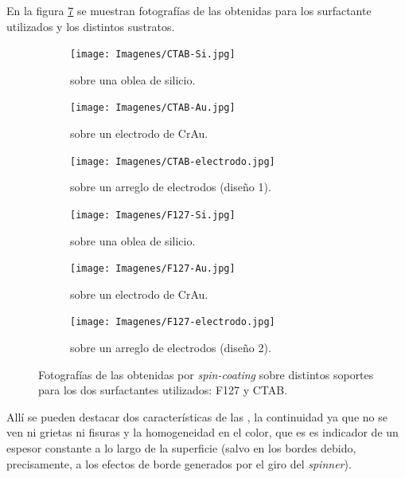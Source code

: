 		En la figura \ref{fig:fotos_films} se muestran fotografías de las \pdm\space obtenidas para los surfactante utilizados y los distintos sustratos. 

			\begin{figure}[th]
	 	   	    \begin{subfigure}[t]{0.325\textwidth}
		        	\texttt{[image: Imagenes/CTAB-Si.jpg]}
		       		\caption{\pdmC\space sobre una oblea de silicio.}
		         	\label{fig:F127_vidrio}
		     		\end{subfigure}
	     		\begin{subfigure}[t]{0.325\textwidth}
		        	\texttt{[image: Imagenes/CTAB-Au.jpg]}
		       		\caption{\pdmC\space sobre un electrodo de Cr\textbar Au.}
		         	\label{fig:F127_silicio}
		     		\end{subfigure}
	     		\begin{subfigure}[t]{0.325\textwidth}
		        	\texttt{[image: Imagenes/CTAB-electrodo.jpg]}
		       		\caption{\pdmC\space sobre un arreglo de electrodos (diseño 1).}
		         	\label{fig:F127_Au}
		     		\end{subfigure}
	 	   	    \begin{subfigure}[t]{0.325\textwidth}
		        	\texttt{[image: Imagenes/F127-Si.jpg]}
		       		\caption{\pdmF\space sobre una oblea de silicio.}
		         	\label{fig:CTAB_vidrio}
		     		\end{subfigure}
	     		\begin{subfigure}[t]{0.325\textwidth}
		        	\texttt{[image: Imagenes/F127-Au.jpg]}
		       		\caption{\pdmF\space sobre un electrodo de Cr\textbar Au.}
		         	\label{fig:CTAB_silicio}
		     		\end{subfigure}
	     		\begin{subfigure}[t]{0.325\textwidth}
		        	\texttt{[image: Imagenes/F127-electrodo.jpg]}
		       		\caption{\pdmF\space sobre un arreglo de electrodos (diseño 2).}
		         	\label{fig:CTAB_Au}
		     		\end{subfigure}
	     		\caption[Películas mesoporosas sobre distintos soportes.]{Fotografías de las \pdm\space obtenidas por \textit{spin-coating }sobre distintos soportes para los dos surfactantes utilizados: F127 y CTAB.}
	     		\label{fig:fotos_films}
	     	   	\end{figure}

		Allí se pueden destacar dos características de las \pdm, la continuidad ya que no se ven ni grietas ni fisuras y la homogeneidad en el color, que es es indicador de un espesor constante a lo largo de la superficie (salvo en los bordes debido, precisamente, a los efectos de borde generados por el giro del \textit{spinner})\cite{Franssila2004,Jaeger2001}.

